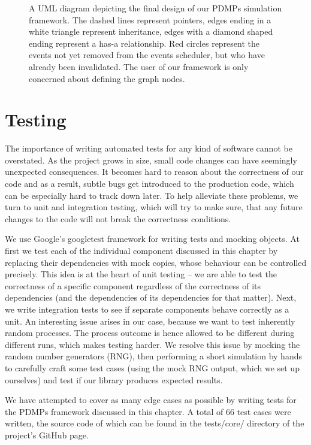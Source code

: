 \documentclass[report.tex]{subfiles}
\begin{document}
\begin{figure}
  \centering
  \def\svgwidth{.95\linewidth}
  
  \caption{A UML diagram depicting the final design of our PDMPs simulation framework.
           The dashed lines represent pointers, edges ending in a white triangle
           represent inheritance, edges with a diamond shaped ending represent a
           has-a relationship. Red circles represent the events not yet removed
           from the events scheduler, but who have already been invalidated.
           The user of our framework is only concerned about defining the graph nodes.}
  \label{image-uml-diagram-dependencies-graph-based-design}
\end{figure}

\section{Testing}
\label{section-testing}

The importance of writing automated tests for any kind of software cannot be overstated.
As the project grows in size, small code changes can have seemingly unexpected consequences.
It becomes hard to reason about the correctness of our code and as a result,
subtle bugs get introduced to the production code, which can be especially hard to
track down later. To help alleviate these problems, we turn to unit and integration testing,
which will try to make sure, that any future changes to the code will not break the
correctness conditions.

We use Google's googletest \cite{googletest-library}
framework for writing tests and mocking objects.
At first we test each of the individual component discussed in this chapter by
replacing their dependencies with mock copies, whose behaviour can be controlled precisely.
This idea is at the heart of unit testing -- we are able to test the correctness of a
specific component regardless of the correctness of its dependencies
(and the dependencies of its dependencies for that matter).
Next, we write integration tests to see if separate components behave correctly as a unit.
An interesting issue arises in our case, because we want to test inherently random
processes. The process outcome is hence allowed to be different during different
runs, which makes testing harder.
We resolve this issue by mocking the random number generators (RNG), then performing
a short simulation by hands to carefully craft some test cases
(using the mock RNG output, which we set up ourselves)
and test if our library produces expected results.

We have attempted to cover as many edge cases as possible by writing tests
for the PDMPs framework discussed in this chapter. A total of 66 test cases were
written, the source code of which can be found in the tests/core/ directory of the
project's GitHub page.
\end{document}
